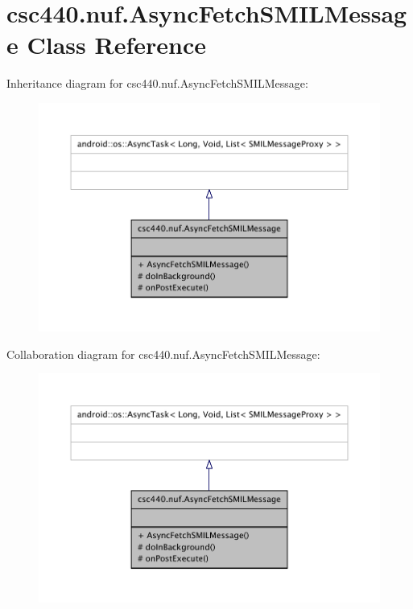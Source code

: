 \hypertarget{classcsc440_1_1nuf_1_1_async_fetch_s_m_i_l_message}{\section{csc440.\-nuf.\-Async\-Fetch\-S\-M\-I\-L\-Message Class Reference}
\label{classcsc440_1_1nuf_1_1_async_fetch_s_m_i_l_message}
}


Inheritance diagram for csc440.\-nuf.\-Async\-Fetch\-S\-M\-I\-L\-Message\-:
\nopagebreak
\begin{figure}[H]
\begin{center}
\leavevmode
\includegraphics[width=350pt]{classcsc440_1_1nuf_1_1_async_fetch_s_m_i_l_message__inherit__graph}
\end{center}
\end{figure}


Collaboration diagram for csc440.\-nuf.\-Async\-Fetch\-S\-M\-I\-L\-Message\-:
\nopagebreak
\begin{figure}[H]
\begin{center}
\leavevmode
\includegraphics[width=350pt]{classcsc440_1_1nuf_1_1_async_fetch_s_m_i_l_message__coll__graph}
\end{center}
\end{figure}

